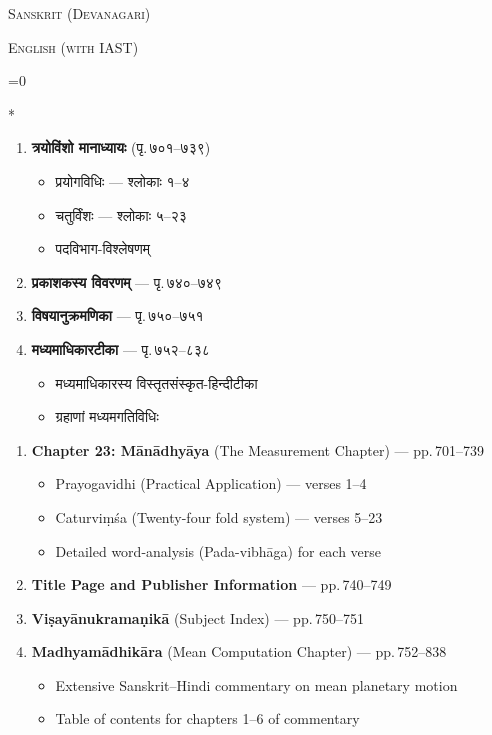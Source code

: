 \documentclass[11pt,a4paper]{article}
\newcommand{\dev}[1]{{\devanagarifont #1}}
\newcommand{\sanskritlabel}{\begin{center}\textcolor{sectioncolor}{\small\textsc{Sanskrit (Devanagari)}}\end{center}}
\newcommand{\englishlabel}{\begin{center}\textcolor{sectioncolor}{\small\textsc{English (with IAST)}}\end{center}}
\newenvironment{paracol}[1]{\begingroup}{\endgroup}
\newcommand{\switchcolumn}[1][]{%
  \ifnum#1=0\relax\else\par\nobreak\vspace{0.5em}\par\nobreak\fi%
}
\begin{document}
\begin{paracol}{2}
\sanskritlabel
\englishlabel
\switchcolumn[0]*

\begin{enumerate}[label=\dev{\arabic*.},leftmargin=*]
  \item \textbf{\dev{त्रयोविंशो मानाध्यायः}} (पृ.\,७०१--७३९)
  \begin{itemize}[label=\textendash,leftmargin=1em]
    \item \dev{प्रयोगविधिः} — श्लोकाः १--४
    \item \dev{चतुर्विंशः} — श्लोकाः ५--२३
    \item \dev{पदविभाग-विश्लेषणम्}
  \end{itemize}
  \item \textbf{\dev{प्रकाशकस्य विवरणम्}} — पृ.\,७४०--७४९
  \item \textbf{\dev{विषयानुक्रमणिका}} — पृ.\,७५०--७५१
  \item \textbf{\dev{मध्यमाधिकारटीका}} — पृ.\,७५२--८३८
  \begin{itemize}[label=\textendash,leftmargin=1em]
    \item \dev{मध्यमाधिकारस्य विस्तृतसंस्कृत-हिन्दीटीका}
    \item \dev{ग्रहाणां मध्यमगतिविधिः}
  \end{itemize}
\end{enumerate}

\switchcolumn

\begin{enumerate}[label=\arabic*.,leftmargin=*]
  \item \textbf{Chapter 23: Mānādhyāya} (The Measurement Chapter) — pp.\,701--739
  \begin{itemize}[label=\textendash,leftmargin=1em]
    \item Prayogavidhi (Practical Application) — verses 1--4
    \item Caturviṃśa (Twenty-four fold system) — verses 5--23
    \item Detailed word-analysis (Pada-vibhāga) for each verse
  \end{itemize}
  \item \textbf{Title Page and Publisher Information} — pp.\,740--749
  \item \textbf{Viṣayānukramaṇikā} (Subject Index) — pp.\,750--751
  \item \textbf{Madhyamādhikāra} (Mean Computation Chapter) — pp.\,752--838
  \begin{itemize}[label=\textendash,leftmargin=1em]
    \item Extensive Sanskrit–Hindi commentary on mean planetary motion
    \item Table of contents for chapters 1--6 of commentary
  \end{itemize}
\end{enumerate}
\end{paracol}
\end{document}
